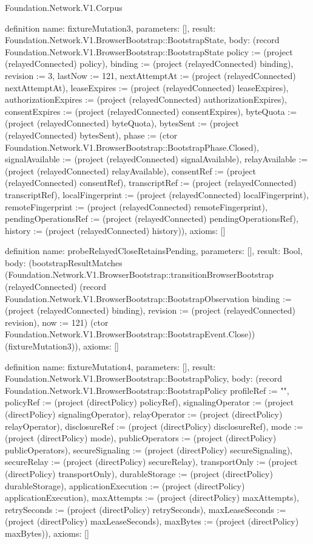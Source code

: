 \begin{lexlean}{Foundation.Network.V1.Corpus}
\begin{semanticmodule}
definition{
  name: fixtureMutation3,
  parameters: [],
  result: Foundation.Network.V1.BrowserBootstrap::BootstrapState,
  body: (record Foundation.Network.V1.BrowserBootstrap::BootstrapState {policy := (project (relayedConnected) policy), binding := (project (relayedConnected) binding), revision := 3, lastNow := 121, nextAttemptAt := (project (relayedConnected) nextAttemptAt), leaseExpires := (project (relayedConnected) leaseExpires), authorizationExpires := (project (relayedConnected) authorizationExpires), consentExpires := (project (relayedConnected) consentExpires), byteQuota := (project (relayedConnected) byteQuota), bytesSent := (project (relayedConnected) bytesSent), phase := (ctor Foundation.Network.V1.BrowserBootstrap::BootstrapPhase.Closed), signalAvailable := (project (relayedConnected) signalAvailable), relayAvailable := (project (relayedConnected) relayAvailable), consentRef := (project (relayedConnected) consentRef), transcriptRef := (project (relayedConnected) transcriptRef), localFingerprint := (project (relayedConnected) localFingerprint), remoteFingerprint := (project (relayedConnected) remoteFingerprint), pendingOperationsRef := (project (relayedConnected) pendingOperationsRef), history := (project (relayedConnected) history)}),
  axioms: []
}

definition{
  name: probeRelayedCloseRetainsPending,
  parameters: [],
  result: Bool,
  body: (bootstrapResultMatches (Foundation.Network.V1.BrowserBootstrap::transitionBrowserBootstrap (relayedConnected) (record Foundation.Network.V1.BrowserBootstrap::BootstrapObservation {binding := (project (relayedConnected) binding), revision := (project (relayedConnected) revision), now := 121}) (ctor Foundation.Network.V1.BrowserBootstrap::BootstrapEvent.Close)) (fixtureMutation3)),
  axioms: []
}

definition{
  name: fixtureMutation4,
  parameters: [],
  result: Foundation.Network.V1.BrowserBootstrap::BootstrapPolicy,
  body: (record Foundation.Network.V1.BrowserBootstrap::BootstrapPolicy {profileRef := "", policyRef := (project (directPolicy) policyRef), signalingOperator := (project (directPolicy) signalingOperator), relayOperator := (project (directPolicy) relayOperator), disclosureRef := (project (directPolicy) disclosureRef), mode := (project (directPolicy) mode), publicOperators := (project (directPolicy) publicOperators), secureSignaling := (project (directPolicy) secureSignaling), secureRelay := (project (directPolicy) secureRelay), transportOnly := (project (directPolicy) transportOnly), durableStorage := (project (directPolicy) durableStorage), applicationExecution := (project (directPolicy) applicationExecution), maxAttempts := (project (directPolicy) maxAttempts), retrySeconds := (project (directPolicy) retrySeconds), maxLeaseSeconds := (project (directPolicy) maxLeaseSeconds), maxBytes := (project (directPolicy) maxBytes)}),
  axioms: []
}


\end{semanticmodule}
\end{lexlean}
